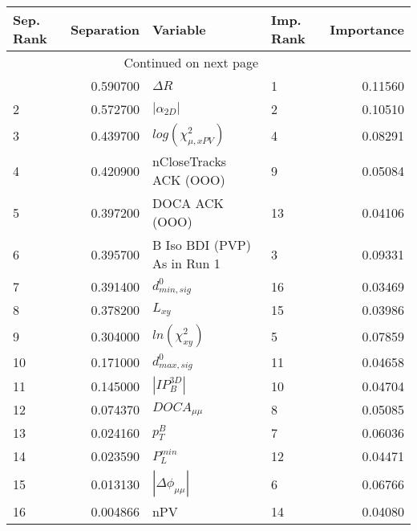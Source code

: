 \usepackage{lscape}

\begin{landscape}
\begin{longtable}{lrllr}
\toprule
Sep. Rank &  Separation &                     Variable & Imp. Rank &  Importance \\
\midrule
\endhead
\midrule
\multicolumn{3}{r}{{Continued on next page}} \\
\midrule
\endfoot

\bottomrule
\endlastfoot
        1 &    0.590700 &                   $\Delta R$ &         1 &     0.11560 \\
        2 &    0.572700 &              $|\alpha_{2D}|$ &         2 &     0.10510 \\
        3 &    0.439700 &    $log(\chi^{2}_{\mu,xPV})$ &         4 &     0.08291 \\
        4 &    0.420900 &       nCloseTracks ACK (OOO) &         9 &     0.05084 \\
        5 &    0.397200 &               DOCA ACK (OOO) &        13 &     0.04106 \\
        6 &    0.395700 &  B Iso BDI (PVP) As in Run 1 &         3 &     0.09331 \\
        7 &    0.391400 &             $d^0_{min, sig}$ &        16 &     0.03469 \\
        8 &    0.378200 &                     $L_{xy}$ &        15 &     0.03986 \\
        9 &    0.304000 &          $ln(\chi^{2}_{xy})$ &         5 &     0.07859 \\
       10 &    0.171000 &             $d^0_{max, sig}$ &        11 &     0.04658 \\
       11 &    0.145000 &              $|IP_{B}^{3D}|$ &        10 &     0.04704 \\
       12 &    0.074370 &              $DOCA_{\mu\mu}$ &         8 &     0.05085 \\
       13 &    0.024160 &                    $p^B_{T}$ &         7 &     0.06036 \\
       14 &    0.023590 &                $P^{min}_{L}$ &        12 &     0.04471 \\
       15 &    0.013130 &     $|\Delta \phi_{\mu\mu}|$ &         6 &     0.06766 \\
       16 &    0.004866 &                          nPV &        14 &     0.04080 \\
\end{longtable}

\end{landscape}
